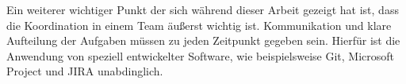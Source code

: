 Ein weiterer wichtiger Punkt der sich während dieser Arbeit gezeigt hat ist, dass die Koordination in einem Team äußerst wichtig ist. Kommunikation und klare Aufteilung der Aufgaben müssen zu jeden Zeitpunkt gegeben sein. Hierfür ist die Anwendung von speziell entwickelter Software, wie beispielsweise Git, Microsoft Project und JIRA unabdinglich.
